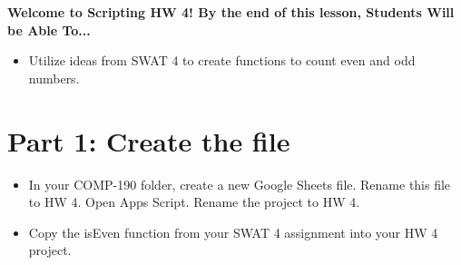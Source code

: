\documentclass{article}
\newcommand{\AName}{Scripting HW 4}
\begin{document}
\textbf{Welcome to \AName!  By the end of this lesson, Students Will be Able To...}
\begin{itemize}
    \item Utilize ideas from SWAT 4 to create functions to count even and odd numbers.
\end{itemize}


\section*{Part 1: Create the file}
\begin{itemize}
    \item In your COMP-190 folder, create a new Google Sheets file.  Rename this file to HW 4.  Open Apps Script.  Rename the project to HW 4.
    \item Copy the isEven function from your SWAT 4 assignment into your HW 4 project.
\end{itemize}
\end{document}
